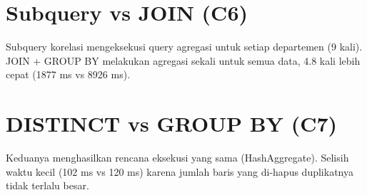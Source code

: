 
\section{Subquery vs JOIN (C6)}
Subquery korelasi mengeksekusi query agregasi untuk setiap departemen (9 kali). JOIN + GROUP BY melakukan agregasi sekali untuk semua data, 4.8 kali lebih cepat (1877 ms vs 8926 ms).


\section{DISTINCT vs GROUP BY (C7)}
Keduanya menghasilkan rencana eksekusi yang sama (HashAggregate). Selisih waktu kecil (102 ms vs 120 ms) karena jumlah baris yang di-hapus duplikatnya tidak terlalu besar.

